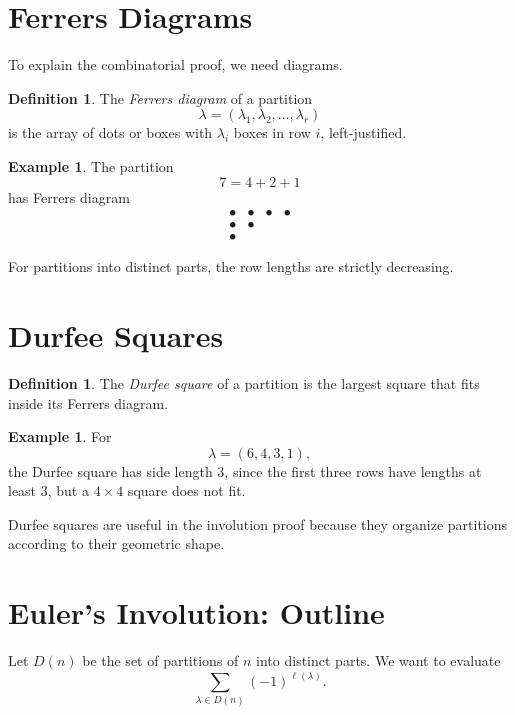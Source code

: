 \documentclass[11pt]{article}
\theoremstyle{definition}
\newtheorem{definition}[theorem]{Definition}
\newtheorem{example}[theorem]{Example}
\theoremstyle{remark}
\begin{document}
	\section{Ferrers Diagrams}
	
	To explain the combinatorial proof, we need diagrams.
	
	\begin{definition}
		The \emph{Ferrers diagram} of a partition
		\[
		\lambda=(\lambda_1,\lambda_2,\dots,\lambda_r)
		\]
		is the array of dots or boxes with \(\lambda_i\) boxes in row \(i\), left-justified.
	\end{definition}
	
	\begin{example}
		The partition
		\[
		7=4+2+1
		\]
		has Ferrers diagram
		\[
		\begin{array}{llll}
			\bullet & \bullet & \bullet & \bullet\\
			\bullet & \bullet\\
			\bullet
		\end{array}
		\]
	\end{example}
	
	For partitions into distinct parts, the row lengths are strictly decreasing.
	
	\section{Durfee Squares}
	
	\begin{definition}
		The \emph{Durfee square} of a partition is the largest square that fits inside its Ferrers diagram.
	\end{definition}
	
	\begin{example}
		For
		\[
		\lambda=(6,4,3,1),
		\]
		the Durfee square has side length \(3\), since the first three rows have lengths at least \(3\), but a \(4\times 4\) square does not fit.
	\end{example}
	
	Durfee squares are useful in the involution proof because they organize partitions according to their geometric shape.
	
	\section{Euler's Involution: Outline}
	
	Let \(D(n)\) be the set of partitions of \(n\) into distinct parts. We want to evaluate
	\[
	\sum_{\lambda\in D(n)}(-1)^{\ell(\lambda)}.
	\]
	
\end{document}
